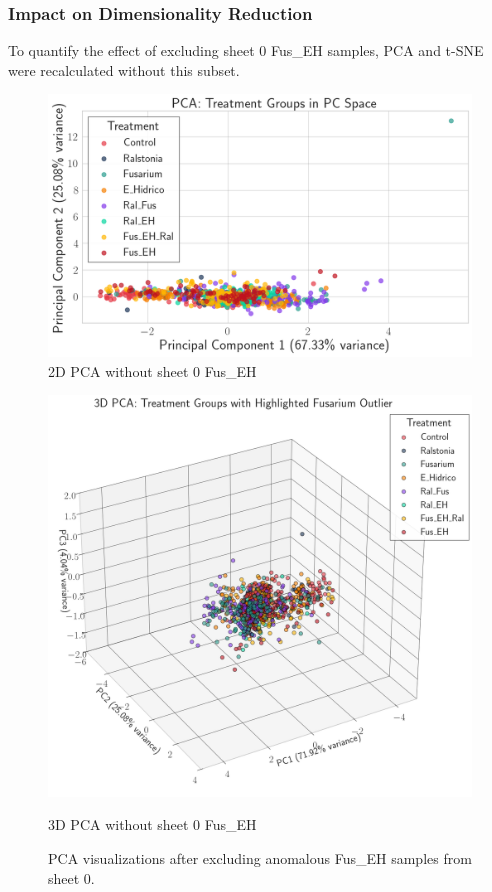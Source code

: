 \documentclass[12pt,a4paper]{article}
\begin{document}
\subsubsection{Impact on Dimensionality Reduction}

To quantify the effect of excluding sheet 0 Fus\_EH samples, PCA and t-SNE were recalculated without this subset.

\begin{figure}[H]
    \centering

    \includegraphics[width=\textwidth]{Plots/PCA_Without_FusEH0.png}
    \caption{2D PCA without sheet 0 Fus\_EH}
    \label{fig:pca_without_fus0}


\end{figure}

\begin{figure}

    \centering

    \includegraphics[width=\textwidth]{Plots/PCA3D_Without_FusEH0.png}
    \caption{3D PCA without sheet 0 Fus\_EH}
    \label{fig:pca3d_without_fus0}

    \caption{PCA visualizations after excluding anomalous Fus\_EH samples from sheet 0.}
    \label{fig:pca_cleaned}
\end{figure}
\end{document}
